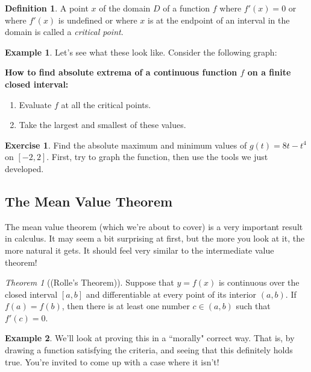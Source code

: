 \documentclass[leqno]{article}
\theoremstyle{definition}
\newtheorem{definition}{Definition}[section]
\newtheorem{example}{Example}[section]
\newtheorem{exercise}{Exercise}[section]
\theoremstyle{remark}
\theoremstyle{theorem}
\newtheorem{theorem}{Theorem}[section]
\begin{document}
\begin{definition}
A point $x$ of the domain $D$ of a function $f$ where $f'(x)=0$ or where $f'(x)$ is undefined or where $x$ is at the endpoint of an interval in the domain is called a \emph{critical point}. 
\end{definition}

\begin{example}
Let's see what these look like.  Consider the following graph:
\vspace*{6cm}\\
\end{example}

\noindent \textbf{How to find absolute extrema of a continuous function $f$ on a finite closed interval:} 
\begin{enumerate}[1.]
\item Evaluate $f$ at all the critical points.
\item Take the largest and smallest of these values.
\end{enumerate}

\begin{exercise}
Find the absolute maximum and minimum values of $g(t)=8t-t^4$ on $[-2,2]$. First, try to graph the function, then use the tools we just developed.
\vspace*{6cm}\\
\end{exercise}

\subsection{The Mean Value Theorem}

The mean value theorem (which we're about to cover) is a very important result in calculus.  It may seem a bit surprising at first, but the more you look at it, the more natural it gets. It should feel very similar to the intermediate value theorem!

\begin{theorem}[(Rolle's Theorem)] 
Suppose that $y=f(x)$ is continuous over the closed interval $[a,b]$ and differentiable at every point of its interior $(a,b)$. If $f(a)=f(b)$, then there is at least one number $c\in (a,b)$ such that $f'(c)=0$.
\end{theorem}

\begin{example}
We'll look at proving this in a ``morally" correct way.  That is, by drawing a function satisfying the criteria, and seeing that this definitely holds true. You're invited to come up with a case where it isn't!
\vspace*{6cm}\\
\end{example}
\end{document}
